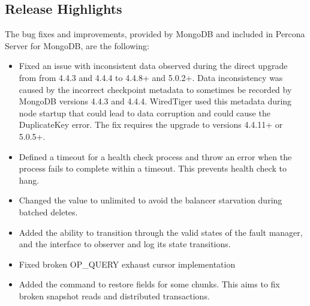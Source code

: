 \documentclass[letterpaper,10pt,english]{sphinxmanual}
\begin{document}
\subsection{Release Highlights}
\label{\detokenize{release_notes/4.4.12-12:release-highlights}}
\sphinxAtStartPar
The bug fixes and improvements, provided by MongoDB and included in Percona Server for MongoDB, are the following:
\begin{itemize}
\item {} 
\sphinxAtStartPar
{} \sphinxhyphen{} Fixed an issue with inconsistent data observed during the direct upgrade from from 4.4.3 and 4.4.4 to 4.4.8+ and 5.0.2+. Data inconsistency was caused by the incorrect checkpoint metadata to sometimes be recorded by MongoDB versions 4.4.3 and 4.4.4. WiredTiger used this metadata during node startup that could lead to data corruption and could cause the DuplicateKey error. The fix requires the upgrade to versions 4.4.11+ or 5.0.5+.

\item {} 
\sphinxAtStartPar
{} \sphinxhyphen{} Defined a timeout for a health check process and throw an error when the process fails to complete within a timeout. This prevents health check to hang.

\item {} 
\sphinxAtStartPar
{} \sphinxhyphen{} Changed the  value to unlimited to avoid the balancer starvation during batched deletes.

\item {} 
\sphinxAtStartPar
{} \sphinxhyphen{} Added the ability to transition through the valid states of the fault manager, and the interface to observer and log its state transitions.

\item {} 
\sphinxAtStartPar
{} \sphinxhyphen{} Fixed broken OP\_QUERY exhaust cursor implementation

\item {} 
\sphinxAtStartPar
{} \sphinxhyphen{} Added the  command to restore  fields for some chunks. This aims to fix broken snapshot reads and distributed transactions.

\end{itemize}
\end{document}
